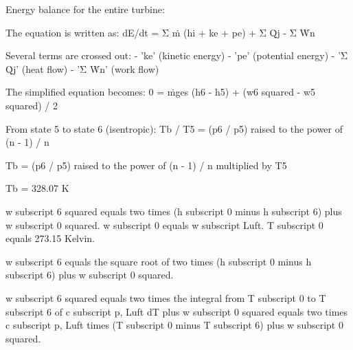 Energy balance for the entire turbine:  

The equation is written as:  
dE/dt = Σ ṁ (hi + ke + pe) + Σ Q̇j - Σ Ẇn  

Several terms are crossed out:  
- 'ke' (kinetic energy)  
- 'pe' (potential energy)  
- 'Σ Q̇j' (heat flow)  
- 'Σ Ẇn' (work flow)  

The simplified equation becomes:  
0 = ṁges (h6 - h5) + (w6 squared - w5 squared) / 2  

From state 5 to state 6 (isentropic):  
Tb / T5 = (p6 / p5) raised to the power of (n - 1) / n  

Tb = (p6 / p5) raised to the power of (n - 1) / n multiplied by T5  

Tb = 328.07 K

w subscript 6 squared equals two times (h subscript 0 minus h subscript 6) plus w subscript 0 squared.  
w subscript 0 equals w subscript Luft.  
T subscript 0 equals 273.15 Kelvin.  

w subscript 6 equals the square root of two times (h subscript 0 minus h subscript 6) plus w subscript 0 squared.  

w subscript 6 squared equals two times the integral from T subscript 0 to T subscript 6 of c subscript p, Luft dT plus w subscript 0 squared equals two times c subscript p, Luft times (T subscript 0 minus T subscript 6) plus w subscript 0 squared.